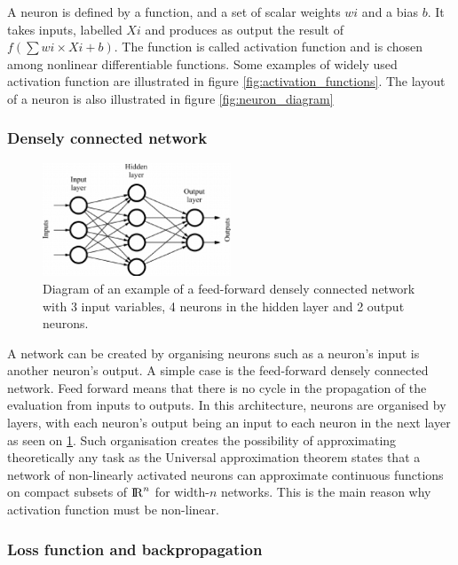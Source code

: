 A neuron is defined by a function, and a set of scalar weights $wi$ and a bias $b$. It takes inputs, labelled $Xi$ and produces as output the result of $f(\sum wi\times Xi + b)$. The function is called activation function and is chosen among nonlinear differentiable functions. Some examples of widely used activation function are illustrated in figure \ref{fig:activation_functions}. The layout of a neuron is also illustrated in figure \ref{fig:neuron_diagram}

\subsubsection{Densely connected network}


\begin{figure}
    \centering
    \includegraphics[width=0.5\textwidth]{Images/dense_network.png}
    \caption{Diagram of an example of a feed-forward densely connected network with 3 input variables, 4 neurons in the hidden layer and 2 output neurons.}
    \label{fig:dense_network}
\end{figure}

A network can be created by organising neurons such as a neuron's input is another neuron's output.
A simple case is the feed-forward densely connected network.
Feed forward means that there is no cycle in the propagation of the evaluation from inputs to outputs.
In this architecture, neurons are organised by layers, with each neuron's output being an input to each neuron in the next layer as seen on \ref{fig:dense_network}. Such organisation creates the possibility of approximating theoretically any task as the Universal approximation theorem states that a network of non-linearly activated neurons can approximate continuous functions on compact subsets of ${\rm I\!R}^{n}$ for width-$n$ networks. This is the main reason why activation function must be non-linear. 

\subsubsection{Loss function and backpropagation}

